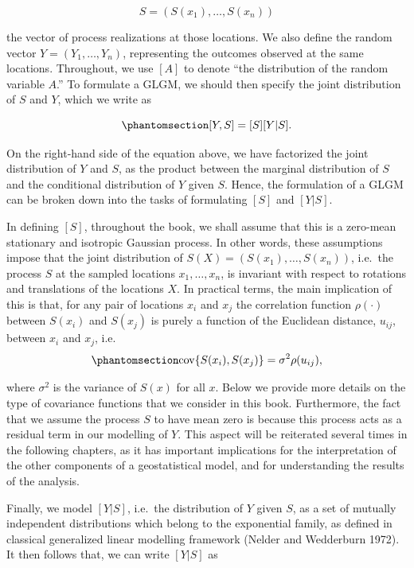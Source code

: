 \documentclass[
  letterpaper,
]{krantz}
\begin{document}
\[
S = (S(x_1), \ldots, S(x_n))
\]

the vector of process realizations at those locations. We also define
the random vector \(Y = (Y_1, \ldots, Y_n)\), representing the outcomes
observed at the same locations. Throughout, we use \([A]\) to denote
``the distribution of the random variable \(A\).'' To formulate a GLGM,
we should then specify the joint distribution of \(S\) and \(Y\), which
we write as

\begin{equation}\phantomsection\label{eq-glgm-joint-ch1}{
[Y, S] = [S] [Y | S].
}\end{equation}

On the right-hand side of the equation above, we have factorized the
joint distribution of \(Y\) and \(S\), as the product between the
marginal distribution of \(S\) and the conditional distribution of \(Y\)
given \(S\). Hence, the formulation of a GLGM can be broken down into
the tasks of formulating \([S]\) and \([Y | S]\).

In defining \([S]\), throughout the book, we shall assume that this is a
zero-mean stationary and isotropic Gaussian process. In other words,
these assumptions impose that the joint distribution of
\(S(X) = (S(x_1),\ldots,S(x_n))\), i.e.~the process \(S\) at the sampled
locations \(x_1, \ldots, x_n\), is invariant with respect to rotations
and translations of the locations \(X\). In practical terms, the main
implication of this is that, for any pair of locations \(x_i\) and
\(x_j\) the correlation function \(\rho(\cdot)\) between \(S(x_i)\) and
\(S(x_j)\) is purely a function of the Euclidean distance, \(u_{ij}\),
between \(x_i\) and \(x_j\),
i.e.~\begin{equation}\phantomsection\label{eq-correlation-ch1}{
{\rm cov}\{S(x_i), S(x_j)\} = \sigma^2\rho(u_{ij}),
}\end{equation}

where \(\sigma^2\) is the variance of \(S(x)\) for all \(x\). Below we
provide more details on the type of covariance functions that we
consider in this book. Furthermore, the fact that we assume the process
\(S\) to have mean zero is because this process acts as a residual term
in our modelling of \(Y\). This aspect will be reiterated several times
in the following chapters, as it has important implications for the
interpretation of the other components of a geostatistical model, and
for understanding the results of the analysis.

Finally, we model \([Y | S]\), i.e.~the distribution of \(Y\) given
\(S\), as a set of mutually independent distributions which belong to
the exponential family, as defined in classical generalized linear
modelling framework (Nelder and Wedderburn 1972). It then follows that,
we can write \([Y | S]\) as
\end{document}

